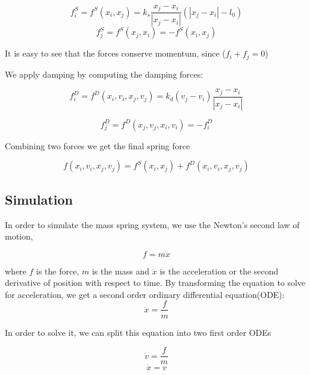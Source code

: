 \documentclass[en]{minipw} %
\begin{document}
\begin{equation}
f_{i}^{S} = f^{S}(x_i, x_j) = k_s \dfrac{x_j - x_i}{|x_j - x_i|}(|x_j - x_i| - l_0)
\end{equation}
\begin{equation}
f_{j}^{S} = f^{S}(x_j, x_i) = -f^{S}(x_i, x_j)
\end{equation}

It is easy to see that the forces conserve momentum, since ($f_i + f_j = 0$)

We apply damping by computing the damping forces:

\begin{equation}
f_{i}^{D} = f^{D}(x_i, v_i, x_j, v_j) = k_d (v_j - v_i) \dfrac{x_j - x_i}{|x_j - x_i|}
\end{equation}

\begin{equation}
f_{j}^{D} = f^{D}(x_j, v_j, x_i, v_i) = -f_{i}^{D}
\end{equation}

Combining two forces we get the final spring force

\begin{equation}
f(x_i, v_i, x_j, v_j) = f^{S}(x_i, x_j) + f^{D}(x_i, v_i, x_j, v_j)
\end{equation}

\subsection{Simulation}
In order to simulate the mass spring system, we use the Newton's second law of motion,

\begin{equation}
f = m \ddot{x}
\end{equation}

where $f$ is the force, $m$ is the mass and $\ddot{x}$ is the acceleration or the second derivative of position with respect to time. By transforming the equation to solve for acceleration, we get a second order ordinary differential equation(ODE):
\begin{equation}
\ddot{x} = \dfrac{f}{m}
\end{equation}

In order to solve it, we can split this equation into two first order ODEs

\begin{equation}
\label{eq:ode_v} 
\dot{v} = \dfrac{f}{m}
\end{equation}
\begin{equation}
\label{eq:ode_x} 
\dot{x} = v
\end{equation}
\end{document}
